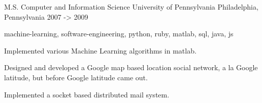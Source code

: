 \cventry
    {M.S. Computer and Information Science} %
    {University of Pennsylvania} %
    {Philadelphia, Pennsylvania} %
    {2007 -> 2009} %
    {
        \begin{cvitems} %
        \item {machine-learning, software-engineering, python, ruby, matlab, sql, java, js}
        \item {Implemented various Machine Learning algorithms in matlab.}
        \item {Designed and developed a Google map based location social network, a la Google latitude, but before Google latitude came out.
        }
        \item {Implemented a socket based distributed mail system.}
        \end{cvitems}
    }
